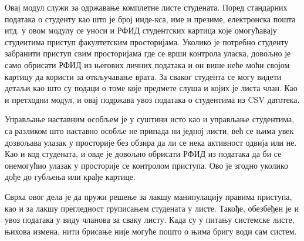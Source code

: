 \documentclass[a4paper, 12pt, diplomski]{etfcyr}
\makeatletter
\gdef\tshortstack{\@ifnextchar[\@tshortstack{\@tshortstack[c]}}
\let\@tshortstack\@shortstack
\makeatother
\begin{document}
\begin{justify}
\begin{labeling}{\smash{\tshortstack[l]{Управљање\\активностима}}}
						\item[\smash{\tshortstack[l]{Управљање\\студентима}}]
							\begin{justify}
								Овај модул служи за одржавање комплетне листе студената. Поред стандарних података о студенту као што је број инде-кса, име и презиме, електронска пошта итд. у овом модулу се уноси и РФИД студентских картица које омогућавају студентима приступ факултетским просторијама. Уколико је потребно студенту забранити приступ свим просторијама где се врши контрола уласка, довољно је само обрисати РФИД из његових личних података и он више неће моћи својом картицу да користи за откључавање врата.
								За сваког студента се могу видети детаљи као што су подаци о томе које предмете слуша и којих је листа члан.
								Као и претходни модул, и овај подржава увоз података о студентима из CSV датотека.
							\end{justify}

						\newpage

						\item[\smash{\tshortstack[l]{Управљање\\наставним\\особљем}}]
							\begin{justify}
								Управљање наставним особљем је у суштини исто као и управљање студентима, са разликом што наставно особље не припада ни једној листи, већ се њима увек дозвољава улазак у просторије без обзира да ли се нека активност одвија или не. Као и код студената, и овде је довољно обрисати РФИД из података да би се онемогућио улазак у просторије се контролом приступа. Ово је згодно уколико дође до губљења или крађе картице.
							\end{justify}

						\item[\smash{\tshortstack[l]{Управљање\\листама}}]
							\begin{justify}
								Сврха овог дела је да пружи решење за лакшу манипулацију правима приступа, као и за лакшу прегледност груписањем студената у листе. Такође, обезбеђен је и увоз података у виду чланова за сваку листу. Када су у питању системске листе, њихова измена, нити брисање није могуће пошто о њима бригу води сам систем.
							\end{justify}


\end{labeling}
\end{justify}
\end{document}
